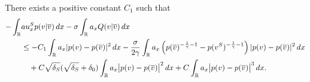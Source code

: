 \documentclass[11pt,reqno]{amsart}
\begin{document}
\begin{lemma} %
    There exists a positive constant $C_1$ such that 
    \begin{align}
    \begin{aligned}\label{quadratic estimate}
        -\int_{\mathbb{R}}& a u^S_x p(v|\overline{v}) \, dx-\sigma \int_{\mathbb{R}} a_x Q(v|\overline{v}) \, dx\\
        &\le -C_1\int_{\mathbb{R}}a_x|p(v)-p(\overline{v})|^2\,dx - \frac{\sigma}{2\gamma}\int_\mathbb{R} a_x \left( p(\overline{v})^{-\frac{1}{\gamma}-1} -p(v^S)^{-\frac{1}{\gamma}-1} \right) |p(v)-p(\overline{v})|^2\, dx \\ 
        &\quad +C\sqrt{\delta_S}(\sqrt{\delta_S}+\delta_0) \int_{\mathbb{R}} a_x\big|p(v)-p(\overline{v})\big|^2 \, d x+C\int_{\mathbb{R}} a_x\big|p(v)-p(\overline{v})\big|^3 \, d x.
    \end{aligned}
    \end{align}
\end{lemma}
\end{document}
